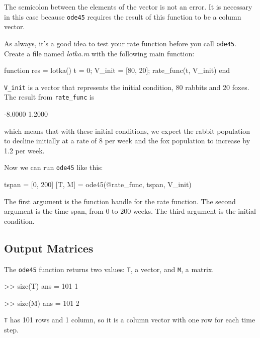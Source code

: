 The semicolon between the elements of the vector is not an error.  It
is necessary in this case because \lstinline{ode45} requires the result of
this function to be a column vector.


As always, it's a good idea to test your rate function before you call \lstinline{ode45}.
Create a file named \emph{lotka.m} with the following main function:

\begin{code}
function res = lotka()
    t = 0;
    V_init = [80, 20];
    rate_func(t, V_init)
end
\end{code}


\lstinline{V_init} is a vector that represents the initial condition, 80 rabbits and 20 foxes.
The result from \lstinline{rate_func} is

\begin{code}
-8.0000
 1.2000
 \end{code}
which means that with these initial conditions, we expect the rabbit population to decline initially at a rate of 8 per week and the fox population to increase by 1.2 per week.

Now we can run \lstinline{ode45} like this:

\begin{code}
tspan = [0, 200]
[T, M] = ode45(@rate_func, tspan, V_init)
\end{code}

The first argument is the function handle for the rate function.
The second argument is the time span, from 0 to 200 weeks.
The third argument is the initial condition.



\subsection{Output Matrices}

The \lstinline{ode45} function returns two values: \lstinline{T}, a vector,
and \lstinline{M}, a matrix.

\begin{code}
>> size(T)
ans = 101     1

>> size(M)
ans = 101     2
\end{code}

\lstinline{T} has 101 rows and 1 column, so it is a column vector with one row for
each time step.

